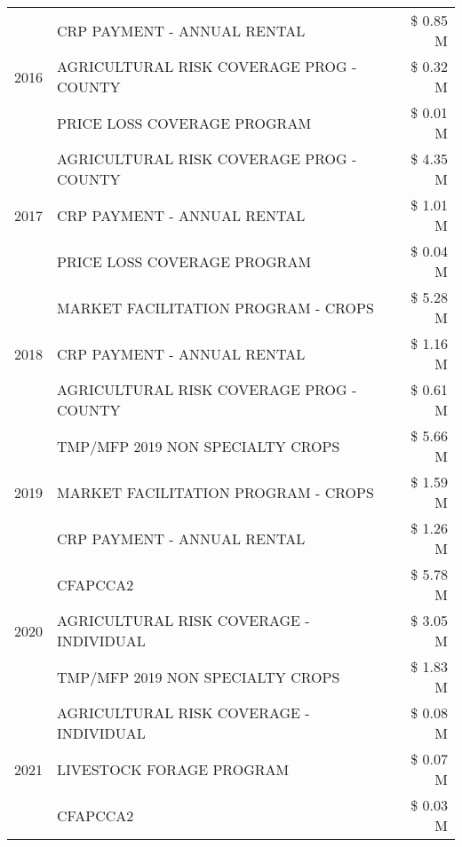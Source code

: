 \begin{tabular}{llr}
\cline{1-3}
\multirow[t]{3}{*}{2016} & CRP PAYMENT - ANNUAL RENTAL & \$ 0.85 M \\
 & AGRICULTURAL RISK COVERAGE PROG - COUNTY & \$ 0.32 M \\
 & PRICE LOSS COVERAGE PROGRAM & \$ 0.01 M \\
\cline{1-3}
\multirow[t]{3}{*}{2017} & AGRICULTURAL RISK COVERAGE PROG - COUNTY & \$ 4.35 M \\
 & CRP PAYMENT - ANNUAL RENTAL & \$ 1.01 M \\
 & PRICE LOSS COVERAGE PROGRAM & \$ 0.04 M \\
\cline{1-3}
\multirow[t]{3}{*}{2018} & MARKET FACILITATION PROGRAM - CROPS & \$ 5.28 M \\
 & CRP PAYMENT - ANNUAL RENTAL & \$ 1.16 M \\
 & AGRICULTURAL RISK COVERAGE PROG - COUNTY & \$ 0.61 M \\
\cline{1-3}
\multirow[t]{3}{*}{2019} & TMP/MFP 2019 NON SPECIALTY CROPS & \$ 5.66 M \\
 & MARKET FACILITATION PROGRAM - CROPS & \$ 1.59 M \\
 & CRP PAYMENT - ANNUAL RENTAL & \$ 1.26 M \\
\cline{1-3}
\multirow[t]{3}{*}{2020} & CFAPCCA2 & \$ 5.78 M \\
 & AGRICULTURAL RISK COVERAGE - INDIVIDUAL & \$ 3.05 M \\
 & TMP/MFP 2019 NON SPECIALTY CROPS & \$ 1.83 M \\
\cline{1-3}
\multirow[t]{3}{*}{2021} & AGRICULTURAL RISK COVERAGE - INDIVIDUAL & \$ 0.08 M \\
 & LIVESTOCK FORAGE PROGRAM & \$ 0.07 M \\
 & CFAPCCA2 & \$ 0.03 M \\
\cline{1-3}
\bottomrule
\end{tabular}
